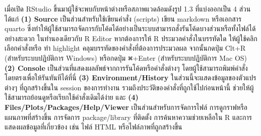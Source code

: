 \documentclass[
  a4paper,
]{book}
\begin{document}
เมื่อเปิด RStudio ขึ้นมาผู้ใช้จะพบกับหน้าต่างหรือสภาพแวดล้อมดังรูป 1.3 ที่แบ่งออกเป็น 4 ส่วน
ได้แก่ \textbf{(1) Source} เป็นส่วนสำหรับใช้เขียนคำสั่ง (scripts) เขียน markdown
หรือเอกสาร quarto
ซึ่งทำให้ผู้ใช้สามารถจัดการกับโค้ดได้อย่างเป็นระบบสามารถสั่งรันโค้ดบางส่วนหรือทั้งไฟล์ได้อย่างสะดวก
ในทำนองเดียวกับ R Editor หากต้องการให้ R ประมวลคำสั่งในบรรทัดใด
ให้ผู้ใช้คลิกเลือกคำสั่งหรือ ทำ highlight คลุมบรรทัดของคำสั่งที่ต้องการประมวลผล
จากนั้นกดปุ่ม Clt+R (สำหรับระบบปฏิบัติการ Windows) หรือกดปุ่ม ⌘+Enter
(สำหรับระบบปฏิบัติการ Mac OS) \textbf{(2) Console}
เป็นส่วนที่แสดงผลลัพธ์จากการรันโค้ดหรือคำสั่งต่างๆ
โดยผู้ใช้สามารถพิมพ์คำสั่งโดยตรงเพื่อให้รันทันทีได้ที่นี่ \textbf{(3) Environment/History}
ในส่วนนี้จะแสดงข้อมูลของตัวแปรต่างๆ ที่ถูกสร้างขึ้นใน session ของการทำงาน
รวมถึงประวัติของคำสั่งที่ถูกใช้ไปก่อนหน้านี้ ช่วยให้ผู้ใช้สามารถย้อนดูหรือเรียกใช้คำสั่งเดิมได้ง่าย
และ \textbf{(4) Files/Plots/Packages/Help/Viewer} เป็นส่วนสำหรับการจัดการไฟล์
การดูกราฟหรือแผนภาพที่สร้างขึ้น การจัดการ package/library ที่ติดตั้ง
การค้นหาความช่วยเหลือใน R และการแสดงผลข้อมูลที่เกี่ยวข้อง เช่น ไฟล์ HTML
หรือไฟล์ภาพที่ถูกสร้างขึ้น
\end{document}
